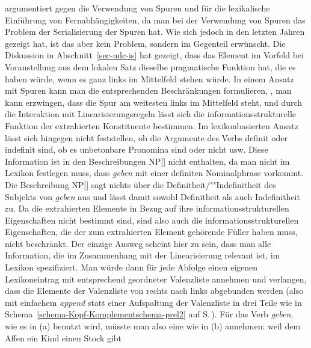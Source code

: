 \citet[--148]{Nerbonne94a} argumentiert gegen die Verwendung von Spuren und für
die lexikalische Einführung von Fernabhängigkeiten, da man bei der Verwendung von Spuren
das Problem der Serialisierung der Spuren hat. Wie sich jedoch in den letzten Jahren gezeigt hat,
ist das aber kein Problem, sondern im Gegenteil erwünscht.
Die Diskussion in Abschnitt~\ref{sec-udc-is} hat gezeigt, dass das Element im Vorfeld
bei Voranstellung aus dem lokalen Satz dieselbe pragmatische Funktion hat, die es
haben würde, wenn es ganz links im Mittelfeld stehen würde. In einem Ansatz mit Spuren kann
man die entsprechenden Beschränkungen formulieren, \dash, man kann erzwingen, dass die
Spur am weitesten links im Mittelfeld steht, und durch die Interaktion mit Linearisierungsregeln
lässt sich die informationsstrukturelle Funktion der extrahierten Konstituente bestimmen.
Im lexikonbasierten Ansatz lässt sich hingegen nicht feststellen, ob die Argumente
des Verbs definit oder indefinit sind, ob es unbetonbare Pronomina sind oder nicht usw.
Diese Information ist in den Beschreibungen NP[] nicht enthalten, da man nicht im
Lexikon festlegen muss, dass \emph{geben} mit einer definiten Nominalphrase vorkommt. Die Beschreibung
NP[] sagt nichts über die Definitheit/""Indefinitheit des Subjekts von \emph{geben} aus
und lässt damit sowohl Definitheit als auch Indefinitheit zu.
Da die extrahierten Elemente in Bezug auf ihre informationsstrukturellen Eigenschaften nicht
bestimmt sind, sind also auch die informationsstrukturellen Eigenschaften, die der zum extrahierten
Element gehörende Füller haben muss, nicht beschränkt.
Der einzige Ausweg scheint hier zu sein, dass man alle Information, die im Zusammenhang
mit der Linearisierung relevant ist, im Lexikon spezifiziert. Man würde dann für jede
Abfolge einen eigenen Lexikoneintrag mit entsprechend geordneter Valenzliste annehmen
und verlangen, dass die Elemente der Valenzliste von rechts nach links abgebunden werden
(also mit einfachem \emph{append} statt einer Aufspaltung der Valenzliste in drei Teile wie in
Schema~\ref{schema-Kopf-Komplementschema-prel2} auf
S.\,\pageref{schema-Kopf-Komplementschema-prel2}). Für das Verb \emph{geben}, wie es in (a) 
benutzt wird, müsste man also eine \compsl wie in (b) annehmen:
\eal
\ex weil dem Affen ein Kind einen Stock gibt
\ex {}
